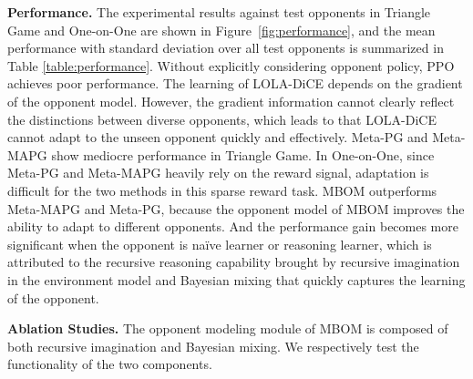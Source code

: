 \documentclass{article}
\begin{document}


\textbf{Performance.} The experimental results against test opponents in Triangle Game and One-on-One are shown in Figure~\ref{fig:performance}, and the mean performance with standard deviation over all test opponents is summarized in Table \ref{table:performance}. Without explicitly considering opponent policy, PPO achieves poor performance. The learning of LOLA-DiCE depends on the gradient of the opponent model. However, the gradient information cannot clearly reflect the distinctions between diverse opponents, which leads to that LOLA-DiCE cannot adapt to the unseen opponent quickly and effectively. Meta-PG and Meta-MAPG show mediocre performance in Triangle Game. In One-on-One, since Meta-PG and Meta-MAPG heavily rely on the reward signal, adaptation is difficult for the two methods in this sparse reward task. MBOM outperforms Meta-MAPG and Meta-PG, because the opponent model of MBOM improves the ability to adapt to different opponents. And the performance gain becomes more significant when the opponent is na\"ive learner or reasoning learner, which is attributed to the recursive reasoning capability brought by recursive imagination in the environment model and Bayesian mixing that quickly captures the learning of the opponent. 


\textbf{Ablation Studies.} The opponent modeling module of MBOM is composed of both recursive imagination and Bayesian mixing. 
We respectively test the functionality of the two components.
\end{document}
